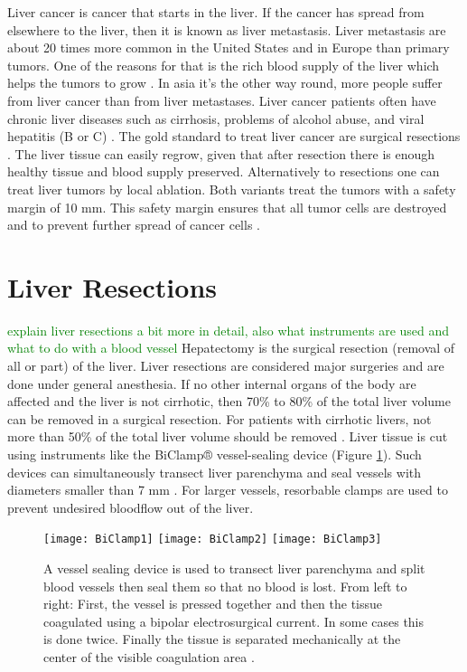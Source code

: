 Liver cancer is cancer that starts in the liver. If the cancer has spread from
elsewhere to the liver, then it is known as liver metastasis. Liver metastasis
are about 20 times more common in the United States and in Europe than primary tumors. One of the reasons for that
is the rich blood supply of the liver which helps the tumors to grow
\cite{mcguire2016world}. In asia it's the other way round, more people suffer
from liver cancer than from liver metastases. Liver cancer patients often have chronic liver diseases
such as cirrhosis, problems of alcohol abuse, and viral hepatitis (B or C)
\cite{galun2015hepatocellular}. The gold standard to treat liver cancer are
surgical resections \cite{lencioni2012local}. The liver tissue can easily regrow, given that after resection there is
enough healthy tissue and blood supply preserved. Alternatively to resections
one can treat liver tumors by local ablation. Both variants treat the tumors
with a safety margin of 10 mm. This safety margin ensures that all tumor cells
are destroyed and to prevent further spread of cancer cells \cite{mahnken2009ct}.
\section{Liver Resections} 
\textcolor{green}{explain liver resections a bit more in detail, also what instruments are used and what to do with a blood vessel}
Hepatectomy is the surgical resection (removal of all or part) of the liver.
Liver resections are considered major surgeries and are done under general
anesthesia. If no other internal organs of the body are affected and the liver
is not cirrhotic, then 70\% to 80\% of the total liver volume can be removed in a
surgical resection. For patients with cirrhotic livers, not more than 50\% of
the total liver volume should be removed \cite{pianka2011liver}. Liver tissue is
cut using instruments like the BiClamp® vessel-sealing device (Figure \ref{fig:BiClampExplained}). Such devices can
simultaneously transect liver parenchyma and seal vessels with diameters smaller
than 7 mm \cite{zhao2017biclamp}. For larger vessels, resorbable clamps are used
to prevent undesired bloodflow out of the liver.
\begin{figure}[H]
  \centering
  \texttt{[image: BiClamp1]}
  \endminipage
  \hfill
  \texttt{[image: BiClamp2]}
  \endminipage
  \hfill
  \texttt{[image: BiClamp3]}
  \endminipage
  \hfill 
 \caption{A vessel sealing device is used to transect liver parenchyma and split
   blood vessels then seal them so that no blood is lost. From left to right:
   First, the vessel is pressed together and then the tissue coagulated using a bipolar
   electrosurgical current. In some cases this is done twice. Finally the tissue
   is separated mechanically at the center of the visible coagulation area \cite{biClampPdfWithImages}. }
  \label{fig:BiClampExplained}
\end{figure}

